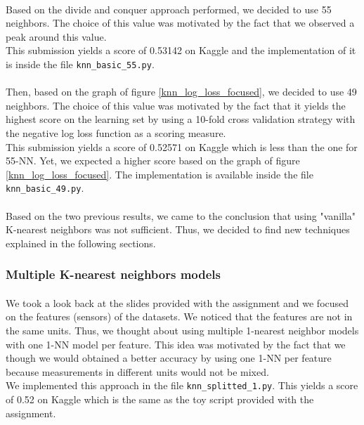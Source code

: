\documentclass[a4paper, 11pt, oneside]{article}
\begin{document}
\paragraph{}Based on the divide and conquer approach performed, we decided to use 55 neighbors. The choice of this value was motivated by the fact that we observed a peak around this value.\\
This submission yields a score of 0.53142 on Kaggle and the implementation of it is inside the file \texttt{knn\_basic\_55.py}.
\paragraph{}Then, based on the graph of figure \ref{knn_log_loss_focused}, we decided to use 49 neighbors. The choice of this value was motivated by the fact that it yields the highest score on the learning set by using a 10-fold cross validation strategy with the negative log loss function as a scoring measure.\\
This submission yields a score of 0.52571 on Kaggle which is less than the one for 55-NN. Yet, we expected a higher score based on the graph of figure \ref{knn_log_loss_focused}. The implementation is available inside the file \texttt{knn\_basic\_49.py}.
\paragraph{}Based on the two previous results, we came to the conclusion that using "vanilla" K-nearest neighbors was not sufficient. Thus, we decided to find new techniques explained in the following sections.

\subsubsection{Multiple K-nearest neighbors models} \label{knnMultiple}
\paragraph{}We took a look back at the slides provided with the assignment and we focused on the features (sensors) of the datasets. We noticed that the features are not in the same units. Thus, we thought about using multiple 1-nearest neighbor models with one 1-NN model per feature. This idea was motivated by the fact that we though we would obtained a better accuracy by using one 1-NN per feature because measurements in different units would not be mixed.\\
We implemented this approach in the file \texttt{knn\_splitted\_1.py}. This yields a score of 0.52 on Kaggle which is the same as the toy script provided with the assignment.
\end{document}
